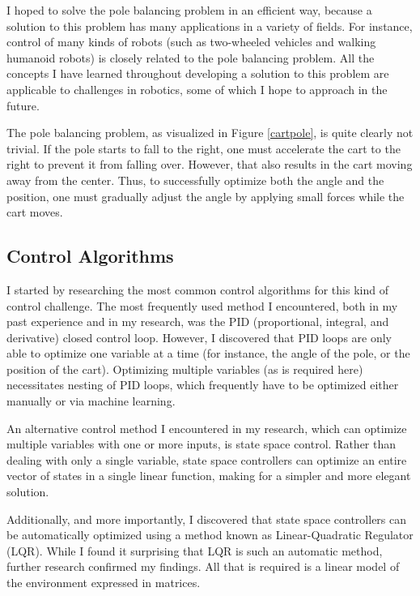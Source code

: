 \documentclass[12pt]{article}
\begin{document}
I hoped to solve the pole balancing problem in an efficient way, because a solution to this problem has many applications in a variety of fields. For instance, control of many kinds of robots (such as two-wheeled vehicles and walking humanoid robots) is closely related to the pole balancing problem. All the concepts I have learned throughout developing a solution to this problem are applicable to challenges in robotics, some of which I hope to approach in the future.

The pole balancing problem, as visualized in Figure \ref{cartpole}, is quite clearly not trivial. If the pole starts to fall to the right, one must accelerate the cart to the right to prevent it from falling over. However, that also results in the cart moving away from the center. Thus, to successfully optimize both the angle and the position, one must gradually adjust the angle by applying small forces while the cart moves.

\subsection{Control Algorithms}

I started by researching the most common control algorithms for this kind of control challenge. The most frequently used method I encountered, both in my past experience and in my research, was the PID (proportional, integral, and derivative) closed control loop. However, I discovered that PID loops are only able to optimize one variable at a time (for instance, the angle of the pole, or the position of the cart). Optimizing multiple variables (as is required here) necessitates nesting of PID loops, which frequently have to be optimized either manually or via machine learning.

An alternative control method I encountered in my research, which can optimize multiple variables with one or more inputs, is state space control. Rather than dealing with only a single variable, state space controllers can optimize an entire vector of states in a single linear function, making for a simpler and more elegant solution.

Additionally, and more importantly, I discovered that state space controllers can be automatically optimized using a method known as Linear-Quadratic Regulator (LQR). While I found it surprising that LQR is such an automatic method, further research confirmed my findings. All that is required is a linear model of the environment expressed in matrices.
\end{document}
